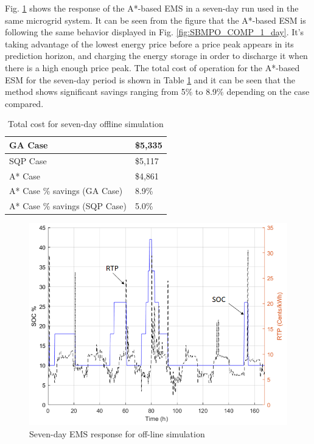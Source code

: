 Fig. \ref{fig:SBMPO_COMP_10_12} shows the response of the A*-based EMS in a seven-day run used in the same microgrid system.  It can be seen from the figure that the A*-based ESM is following the same behavior displayed in Fig. \ref{fig:SBMPO_COMP_1_day}. It's taking advantage of the lowest energy price before a price peak appears in its prediction horizon, and charging the energy storage in order to discharge it when there is a high enough price peak. The total cost of operation for the A*-based ESM for the seven-day period is shown in Table \ref{tab:Cost1} and it can be seen that the method shows significant savings ranging from 5\% to 8.9\% depending on the case compared.

\begin{table}[htb]
\caption{Total cost for seven-day offline simulation}
\centering
\label{tab:Cost1}
\begin{tabular}{|l|l|}
\hline
GA Case & \$5,335 \\ \hline
SQP Case & \$5,117 \\ \hline
A* Case & \$4,861 \\ \hline
A* Case \% savings (GA Case) & 8.9\% \\ \hline
A* Case \% savings (SQP Case) & 5.0\% \\ \hline
\end{tabular}
\end{table}


\begin{figure}[!ht]
    \centering
    \includegraphics[width = 0.8\linewidth]{figs/SBMPO_COMP_10_12.png}
    \caption{Seven-day EMS response for off-line simulation}
    \label{fig:SBMPO_COMP_10_12}
\end{figure}